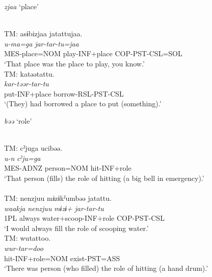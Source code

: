 \begin{exe}\ex\label{ex:4.28}
\textit{zjaa} ‘place’
\begin{xlist}
\ex\label{ex:4.28a}\relax [Co: 110328\_00.txt]\\ {TM:}  {asɨbizjaa} {jatattujaa.}\\
  {\itshape u-ma=ga}  {\itshape jar-tar-tu=jaa}\\
  {MES-place=NOM} {play-INF+place} {COP-PST-CSL=SOL}\\
  \glt{} ‘That place was the place to play, you know.’
\ex\label{ex:4.28b} \relax[Co: 120415\_00.txt]\\{TM:}  {katəətattu.}\\
   {\textit{kar-təər-tar-tu}}\\
  {put-INF+place} {borrow-RSL-PST-CSL}\\
  \glt{} ‘(They) had borrowed a place to put (something).’
\end{xlist}
\textit{bəə} ‘role’
\begin{xlist}\setcounter{xnumii}{2}
\ex\label{ex:4.28c}\relax[Co: 111113\_02.txt]\\ {TM:}  {cˀjuga} {ucibəə.}\\
  {\itshape u-n} {\itshape cˀju=ga} \\
  {MES-ADNZ} {person=NOM} {hit-INF+role}\\
  \glt {} ‘That person (fills) the role of hitting (a big bell in emergency).’
\ex\label{ex:4.28d}\relax[Co: 120415\_00.txt]\\\\
  {TM:}  {{\textbar}nenzjuu{\textbar}} {mɨzɨkˀumbəə} {jatattu.}\\
  {\itshape waakja} {\itshape nenzjuu} {\textit{mɨzɨ+}} {\itshape jar-tar-tu}\\
  {1PL} {always} {water+scoop-INF+role} {COP-PST-CSL}\\
  \glt{} ‘I would always fill the role of scooping water.’
\ex\label{ex:4.28e}\relax[El: 140227]\\{TM:}  {wutattoo.}\\
   {\itshape wur-tar=doo}\\
  {hit-INF+role=NOM} {exist-PST=ASS}\\
  \glt{} ‘There was person (who filled) the role of hitting (a hand drum).’
\z
\z


\end{xlist}
\end{exe}
